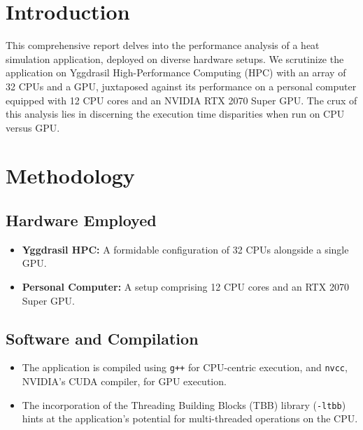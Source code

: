 \documentclass[11pt]{article}
\begin{document}
    
    \maketitle
    \thispagestyle{empty}
    \newpage

    \tableofcontents
    
    \newpage
    
    \hypertarget{introduction}{%
    \section{Introduction}\label{introduction}}

    This comprehensive report delves into the performance analysis of a heat
    simulation application, deployed on diverse hardware setups. We
    scrutinize the application on Yggdrasil High-Performance Computing (HPC)
    with an array of 32 CPUs and a GPU, juxtaposed against its performance
    on a personal computer equipped with 12 CPU cores and an NVIDIA RTX 2070
    Super GPU. The crux of this analysis lies in discerning the execution
    time disparities when run on CPU versus GPU.

    \hypertarget{methodology}{%
    \section{Methodology}\label{methodology}}

    \hypertarget{hardware-employed}{%
    \subsection{Hardware Employed}\label{hardware-employed}}

    \begin{itemize}
    
    \item
    \textbf{Yggdrasil HPC:} A formidable configuration of 32 CPUs
    alongside a single GPU.
    \item
    \textbf{Personal Computer:} A setup comprising 12 CPU cores and an RTX
    2070 Super GPU.
    \end{itemize}

    \hypertarget{software-and-compilation}{%
    \subsection{Software and Compilation}\label{software-and-compilation}}

    \begin{itemize}
    
    \item
    The application is compiled using \texttt{g++} for CPU-centric
    execution, and \texttt{nvcc}, NVIDIA's CUDA compiler, for GPU
    execution.
    \item
    The incorporation of the Threading Building Blocks (TBB) library
    (\texttt{-ltbb}) hints at the application's potential for
    multi-threaded operations on the CPU.
    \end{itemize}
\end{document}
